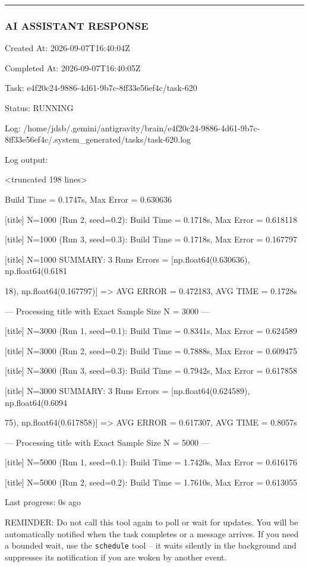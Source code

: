 \documentclass[11pt,a4paper]{article}
\begin{document}
\hrule

\subsubsection{AI ASSISTANT RESPONSE}

Created At: 2026-09-07T16:40:04Z

Completed At: 2026-09-07T16:40:05Z

Task: e4f20c24-9886-4d61-9b7c-8ff33e56ef4c/task-620

Status: RUNNING

Log: /home/jdsb/.gemini/antigravity/brain/e4f20c24-9886-4d61-9b7c-8ff33e56ef4c/.system\_generated/tasks/task-620.log

Log output:

<truncated 198 lines>

Build Time = 0.1747s, Max Error = 0.630636

[title] N=1000 (Run 2, seed=0.2): Build Time = 0.1718s, Max Error = 0.618118

[title] N=1000 (Run 3, seed=0.3): Build Time = 0.1718s, Max Error = 0.167797

[title] N=1000 SUMMARY: 3 Runs Errors = [np.float64(0.630636), np.float64(0.6181

18), np.float64(0.167797)] => AVG ERROR = 0.472183, AVG TIME = 0.1728s

--- Processing title with Exact Sample Size N = 3000 ---

[title] N=3000 (Run 1, seed=0.1): Build Time = 0.8341s, Max Error = 0.624589

[title] N=3000 (Run 2, seed=0.2): Build Time = 0.7888s, Max Error = 0.609475

[title] N=3000 (Run 3, seed=0.3): Build Time = 0.7942s, Max Error = 0.617858

[title] N=3000 SUMMARY: 3 Runs Errors = [np.float64(0.624589), np.float64(0.6094

75), np.float64(0.617858)] => AVG ERROR = 0.617307, AVG TIME = 0.8057s

--- Processing title with Exact Sample Size N = 5000 ---

[title] N=5000 (Run 1, seed=0.1): Build Time = 1.7420s, Max Error = 0.616176

[title] N=5000 (Run 2, seed=0.2): Build Time = 1.7610s, Max Error = 0.613055


Last progress: 0s ago



REMINDER: Do not call this tool again to poll or wait for updates. You will be automatically notified when the task completes or a message arrives. If you need a bounded wait, use the \texttt{schedule} tool -- it waits silently in the background and suppresses its notification if you are woken by another event.
\end{document}
